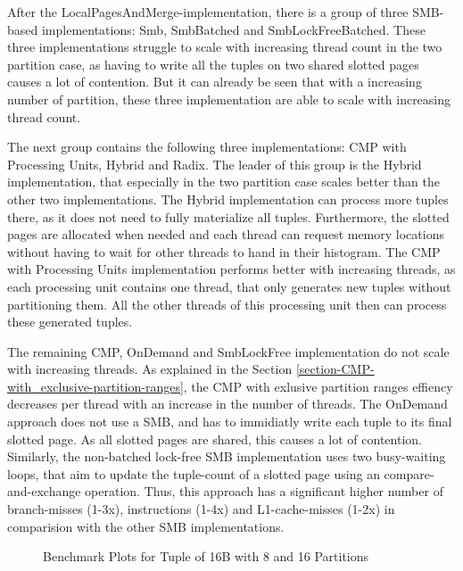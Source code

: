After the LocalPagesAndMerge-implementation, there is a group of three \acf{SMB}-based implementations: Smb, SmbBatched and SmbLockFreeBatched.
These three implementations struggle to scale with increasing thread count in the two partition case, as having to write all the tuples on two shared slotted pages causes a lot of contention.
But it can already be seen that with a increasing number of partition, these three implementation are able to scale with increasing thread count.

The next group contains the following three implementations: \acf{CMP} with Processing Units, Hybrid and Radix.
The leader of this group is the Hybrid implementation, that especially in the two partition case scales better than the other two implementations.
The Hybrid implementation can process more tuples there, as it does not need to fully materialize all tuples.
Furthermore, the slotted pages are allocated when needed and each thread can request memory locations without having to wait for other threads to hand in their histogram.
The \ac{CMP} with Processing Units implementation performs better with increasing threads, as each processing unit contains one thread, that only generates new tuples without partitioning them.
All the other threads of this processing unit then can process these generated tuples.

The remaining \ac{CMP}, OnDemand and SmbLockFree implementation do not scale with increasing threads.
As explained in the Section \ref{section-CMP-with_exclusive-partition-ranges}, the \ac{CMP} with exlusive partition ranges effiency decreases per thread with an increase in the number of threads.
The OnDemand approach does not use a \ac{SMB}, and has to immidiatly write each tuple to its final slotted page.
As all slotted pages are shared, this causes a lot of contention.
Similarly, the non-batched lock-free \ac{SMB} implementation uses two busy-waiting loops, that aim to update the tuple-count of a slotted page using an compare-and-exchange operation.
Thus, this approach has a significant higher number of branch-misses (1-3x), instructions (1-4x) and L1-cache-misses (1-2x) in comparision with the other \ac{SMB} implementations.
\begin{figure}[h]
  \centering
  \begin{subfigure}{.49\textwidth}
    \centering
    \resizebox{\linewidth}{!}{}
  \end{subfigure}
  \begin{subfigure}{.49\textwidth}
    \centering
    \resizebox{\linewidth}{!}{}
  \end{subfigure}
  \begin{subfigure}{\textwidth}
    \centering
    \resizebox{\linewidth}{!}{}
  \end{subfigure}
  \caption[Shuffle Benchmark Plots for Tuple of 16B with 8 and 16 Partitions]{Benchmark Plots for Tuple of 16B with 8 and 16 Partitions}
  \label{plot-shuffle-16B-8-16}
\end{figure}


